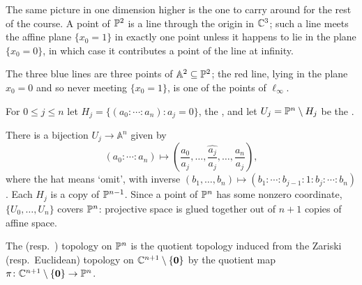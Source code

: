 \documentclass[a4paper]{scrartcl}
\newcommand{\A}{\mathbb{A}}
\begin{document}
The same picture in one dimension higher is the one to carry around for the rest of the course. A point of $\mathbb{P}^2$ is a line through the origin in $\mathbb{C}^3$; such a line meets the affine plane $\{x_0 = 1\}$ in exactly one point unless it happens to lie in the plane $\{x_0 = 0\}$, in which case it contributes a point of the line at infinity.

\begin{center}
\end{center}

The three blue lines are three points of $\A^2 \subseteq \PP^2$; the red line, lying in the plane $x_0 = 0$ and so never meeting $\{x_0=1\}$, is one of the points of $\ell_\infty$.

\begin{definition}
	For $0 \leq j \leq n$ let $H_j = \{(a_0:\cdots:a_n) : a_j = 0\}$, the , and let $U_j = \mathbb{P}^n \setminus H_j$ be the .
\end{definition}

There is a bijection $U_j \to \A^n$ given by
$$(a_0 : \cdots : a_n) \longmapsto \left(\frac{a_0}{a_j},\dots,\widehat{\frac{a_j}{a_j}},\dots,\frac{a_n}{a_j}\right),$$
where the hat means `omit', with inverse $(b_1,\dots,b_n) \mapsto (b_1 : \cdots : b_{j-1} : 1 : b_j : \cdots : b_n)$. Each $H_j$ is a copy of $\mathbb{P}^{n-1}$. Since a point of $\mathbb{P}^n$ has some nonzero coordinate, $\{U_0,\dots,U_n\}$ covers $\mathbb{P}^n$: projective space is glued together out of $n+1$ copies of affine space.

\begin{definition}
	The  (resp.\ ) topology on $\mathbb{P}^n$ is the quotient topology induced from the Zariski (resp.\ Euclidean) topology on $\mathbb{C}^{n+1}\setminus\{\mathbf{0}\}$ by the quotient map $\pi \colon \mathbb{C}^{n+1}\setminus\{\mathbf 0\} \to \mathbb{P}^n$.
\end{definition}
\end{document}
